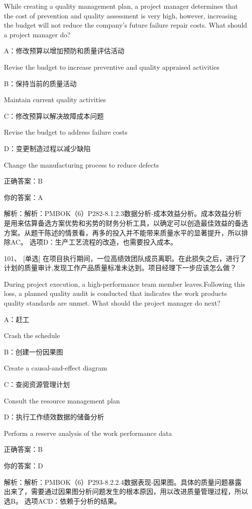 While creating a quality management plan, a project manager determines that the cost of prevention and quality assessment is very high, however, increasing the budget will not reduce the company's future failure repair costs. What should a project manager do?

A：修改预算以增加预防和质量评估活动

Revise the budget to increase preventive and quality appraised activities

B：保持当前的质量活动

Maintain current quality activities

C：修改预算以解决故障成本问题

Revise the budget to address failure costs

D：变更制造过程以减少缺陷

Change the manufacturing process to reduce defects

正确答案：B

你的答案：A

解析：解析：PMBOK（6）P282-8.1.2.3数据分析-成本效益分析。成本效益分析是用来估算备选方案优势和劣势的财务分析工具，以确定可以创造最佳效益的备选方案。从题干陈述的情景看，再多的投入并不能带来质量水平的显著提升，所以排除AC。 选项D：生产工艺流程的改造，也需要投入成本。


101、 [单选] 在项目执行期间，一位高绩效团队成员离职。在此损失之后，进行了计划的质量审计,发现工作产品质量标准未达到。项目经理下一步应该怎么做？

During project execution, a high-performance team member leaves.Following this loss, a planned quality audit is conducted that indicates the work products quality standards are unmet. What should the project manager do next?

A：赶工

Crash the schedule

B：创建一份因果图

Create a causal-and-effect diagram

C：查阅资源管理计划

Consult the resource management plan

D：执行工作绩效数据的储备分析

Perform a reserve analysis of the work performance data

正确答案：B

你的答案：D

解析：解析：PMBOK（6）P293-8.2.2.4数据表现-因果图。具体的质量问题暴露出来了，需要通过因果图分析问题发生的根本原因，用以改进质量管理过程，所以选B。 选项ACD：依赖于分析的结果。


